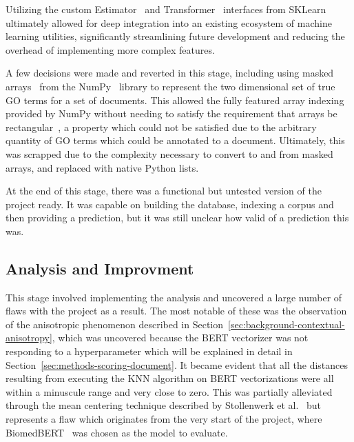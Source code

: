\documentclass[11pt]{article}
\theoremstyle{plain}
\theoremstyle{definition}
\begin{document}
Utilizing the custom Estimator~\cite{sklearn/2026/estimators} and Transformer~\cite{sklearn/2026/transformer} interfaces from SKLearn ultimately allowed for deep integration into an existing ecosystem of machine learning utilities, significantly streamlining future development and reducing the overhead of implementing more complex features.

A few decisions were made and reverted in this stage, including using masked arrays~\cite{numpy/2026/masked} from the NumPy~\cite{harris/2020/array} library to represent the two dimensional set of true GO terms for a set of documents. This allowed the fully featured array indexing provided by NumPy without needing to satisfy the requirement that arrays be rectangular~\cite{numpy/2026/beginner}, a property which could not be satisfied due to the arbitrary quantity of GO terms which could be annotated to a document. Ultimately, this was scrapped due to the complexity necessary to convert to and from masked arrays, and replaced with native Python lists.

At the end of this stage, there was a functional but untested version of the project ready. It was capable on building the database, indexing a corpus and then providing a prediction, but it was still unclear how valid of a prediction this was.

\subsection{Analysis and Improvment}\label{sec:development-testing}

This stage involved implementing the analysis and uncovered a large number of flaws with the project as a result. The most notable of these was the observation of the anisotropic phenomenon described in Section~\ref{sec:background-contextual-anisotropy}, which was uncovered because the BERT vectorizer was not responding to a hyperparameter which will be explained in detail in Section~\ref{sec:methods-scoring-document}. It became evident that all the distances resulting from executing the KNN algorithm on BERT vectorizations were all within a minuscule range and very close to zero. This was partially alleviated through the mean centering technique described by Stollenwerk et al.~\cite{stollenwerk/2026/output} but represents a flaw which originates from the very start of the project, where BiomedBERT~\cite{gu/2021/domainspecific} was chosen as the model to evaluate.
\end{document}
